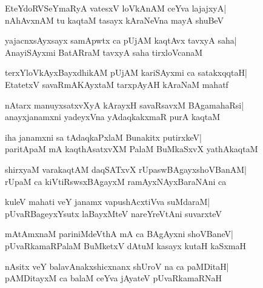 \documentclass[twoside,12pt,openright]{book}
\newcounter{shloka}[chapter]
\begin{document}
\begin{shloka}%
EteYdoRVSeYmaRyA vatesxV loVkAnAM ceYva lajajxyA|\\
nAhAvxnAM tu kaqtaM tasayx kAraNeVna mayA shuBeV
\end{shloka}

\begin{shloka}%
yajacnxsAyxsayx samApwtx ca pUjAM kaqtAvx tavxyA saha|\\
AnayiSAyxmi BatARraM tavxyA saha tirxloVcanaM
\end{shloka}

\begin{shloka}%
terxYloVkAyxBayxdhikAM pUjAM kariSAyxmi ca satakxqqtaH|\\
EtatetxV savaRmAKAyxtaM tarxpAyAH kAraNaM mahatf
\end{shloka}

\begin{shloka}%
nAtarx manuyxsatxvXyA kArayxH savaRsavxM BAgamahaRsi|\\
anayxjanamxni yadeyxVna yAdaqkakxmaR purA kaqtaM
\end{shloka}

\begin{shloka}%
iha janamxni sa tAdaqkaPxlaM Bunakitx putirxkeV|\\
paritApaM mA kaqthAsatxvXM PalaM BuMkaSxvX yathAkaqtaM
\end{shloka}

\begin{shloka}%
shirxyaM varakaqtAM daqSATxvX rUpaswBAgayxshoVBanAM|\\
rUpaM ca kiVtiRswsxBAgayxM ramAyxNAyxBaraNAni ca
\end{shloka}

\begin{shloka}%
kuleV mahati veY janamx vapushAcxtiVva suMdaraM|\\
pUvaRBageyxYsutx laBayxMteV nareYreVtAni suvarxteV
\end{shloka}

\begin{shloka}%
mAtAmxnaM pariniMdeVthA mA ca BAgAyxni shoVBaneV|\\
pUvaRkamaRPalaM BuMketxV dAtuM kasayx kutaH kaSxmaH
\end{shloka}

\begin{shloka}%
nAsitx veY balavAnakxshicxnanx shUroV na ca paMDitaH|\\
pAMDitayxM ca balaM ceYva jAyateV pUvaRkamaRNaH
\end{shloka}
\end{document}
